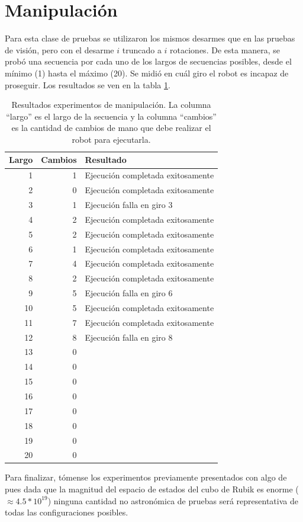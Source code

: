 \section{Manipulación}
Para esta clase de pruebas se utilizaron los mismos desarmes que en las pruebas de visión, pero con el desarme $i$ truncado a $i$ rotaciones. De esta manera, se probó una secuencia por cada uno de los largos de secuencias posibles, desde el mínimo (1) hasta el máximo (20). Se midió en cuál giro el robot es incapaz de proseguir. Los resultados se ven en la tabla \ref{resultadogiros}.

\begin{table}[h!]
	\centering
	\begin{tabular}{|r|r|l|}
		\hline
		Largo & Cambios & Resultado \\ \hline \hline
		 1 & 1 & Ejecución completada exitosamente \\ \hline
		 2 & 0 & Ejecución completada exitosamente \\ \hline
		 3 & 1 & Ejecución falla en giro 3 \\ \hline
		 4 & 2 & Ejecución completada exitosamente \\ \hline
		 5 & 2 & Ejecución completada exitosamente \\ \hline
		 6 & 1 & Ejecución completada exitosamente \\ \hline
		 7 & 4 & Ejecución completada exitosamente \\ \hline
		 8 & 2 & Ejecución completada exitosamente \\ \hline
		 9 & 5 & Ejecución falla en giro 6 \\ \hline
		10 & 5 & Ejecución completada exitosamente \\ \hline
		11 & 7 & Ejecución completada exitosamente \\ \hline
		12 & 8 & Ejecución falla en giro 8 \\ \hline
		13 & 0 &  \\ \hline
		14 & 0 &  \\ \hline
		15 & 0 &  \\ \hline
		16 & 0 &  \\ \hline
		17 & 0 &  \\ \hline
		18 & 0 &  \\ \hline
		19 & 0 &  \\ \hline
		20 & 0 &  \\ \hline
	\end{tabular}
	\caption{Resultados experimentos de manipulación. La columna ``largo'' es el largo de la secuencia y la columna ``cambios'' es la cantidad de cambios de mano que debe realizar el robot para ejecutarla.}
	\label{resultadogiros}
\end{table}

Para finalizar, tómense los experimentos previamente presentados con algo de pues dada que la magnitud del espacio de estados del cubo de Rubik es enorme ($\approx 4.5*10^{19}$) ninguna cantidad no astronómica de pruebas será representativa de todas las configuraciones posibles.
